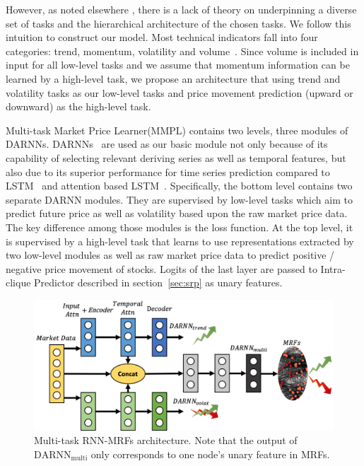 However, as noted elsewhere
\cite{caruana1993multitask,ruder2017overview}, there is a lack of
theory on underpinning a diverse set of tasks and the
hierarchical architecture of the chosen tasks. We follow this
intuition to construct our model. Most technical indicators fall
into four categories: trend, momentum, volatility and
volume~\cite{kirkpatrick2010technical}. Since volume is included
in input for all low-level tasks and we assume that momentum
information can be learned by a high-level task, we propose an
architecture that using trend and volatility tasks as our low-level tasks and price movement prediction (upward or downward) as
the high-level task.


Multi-task Market Price Learner(MMPL) contains two
levels, three modules of DARNNs. DARNNs~\cite{qin2017dual} are
used as our basic module not only because of its capability of
selecting relevant deriving series as well as temporal features,
but also due to its superior performance for time series
prediction compared to LSTM~\cite{hochreiter1997long} and
attention based LSTM~\cite{attention}. Specifically, the bottom
level contains two separate DARNN modules. They are supervised by
low-level tasks which aim to predict future price as well as
volatility based upon the raw market price data. The key
difference among those modules is the loss function. At the top
level, it is supervised by a high-level task that learns to use
representations extracted by two low-level modules as well as raw
market price data to predict positive / negative price movement
of stocks. Logits of the last layer are passed to Intra-clique
Predictor described in section~\ref{sec:srp} as unary features.

\begin{figure}[t]
  \centering
  \includegraphics[width=1\columnwidth]{Methodology/figures/mmplmrf.png}
  \caption{\label{fig:mrfrnn} Multi-task RNN-MRFs architecture. Note 
  that the output of $\text{DARNN}_{\text{multi}}$ only corresponds to one 
  node's unary feature in MRFs.}
\end{figure}

